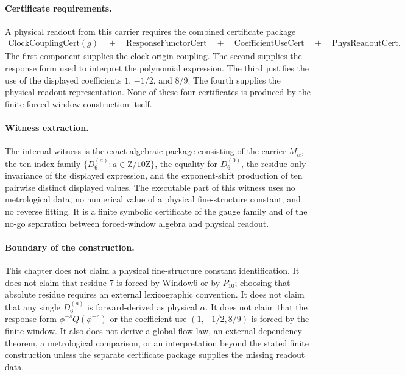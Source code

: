 \paragraph{Certificate requirements.}
A physical readout from this carrier requires the combined certificate package
$$
\begin{aligned}
\mathrm{ClockCouplingCert}(g)\quad +\quad \mathrm{ResponseFunctorCert}\quad +\quad \mathrm{CoefficientUseCert}\quad +\quad \mathrm{PhysReadoutCert}.
\end{aligned}
$$
The first component supplies the clock-origin coupling.  The second supplies the response form used to interpret the polynomial expression.  The third justifies the use of the displayed coefficients $1$, $-1/2$, and $8/9$.  The fourth supplies the physical readout representation.  None of these four certificates is produced by the finite forced-window construction itself.

\paragraph{Witness extraction.}
The internal witness is the exact algebraic package consisting of the carrier $M_{\alpha}$, the ten-index family $\{D_{6}^{(a)}:a\in \mathrm{Z}/10\mathrm{Z}\}$, the equality for $D_{6}^{(0)}$, the residue-only invariance of the displayed expression, and the exponent-shift production of ten pairwise distinct displayed values.  The executable part of this witness uses no metrological data, no numerical value of a physical fine-structure constant, and no reverse fitting.  It is a finite symbolic certificate of the gauge family and of the no-go separation between forced-window algebra and physical readout.

\paragraph{Boundary of the construction.}
This chapter does not claim a physical fine-structure constant identification.  It does not claim that residue $7$ is forced by $\mathrm{Window6}$ or by $P_{10}$; choosing that absolute residue requires an external lexicographic convention.  It does not claim that any single $D_{6}^{(a)}$ is forward-derived as physical $\alpha$.  It does not claim that the response form $\phi^{-s}Q(\phi^{-r})$ or the coefficient use $(1,-1/2,8/9)$ is forced by the finite window.  It also does not derive a global flow law, an external dependency theorem, a metrological comparison, or an interpretation beyond the stated finite construction unless the separate certificate package supplies the missing readout data.

